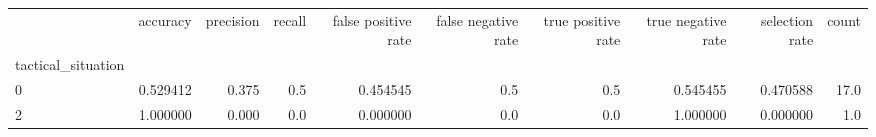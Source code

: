 \begin{tabular}{lrrrrrrrrr}
\toprule
{} &  accuracy &  precision &  recall &  false positive rate &  false negative rate &  true positive rate &  true negative rate &  selection rate &  count \\
tactical\_situation &           &            &         &                      &                      &                     &                     &                 &        \\
\midrule
0                  &  0.529412 &      0.375 &     0.5 &             0.454545 &                  0.5 &                 0.5 &            0.545455 &        0.470588 &   17.0 \\
2                  &  1.000000 &      0.000 &     0.0 &             0.000000 &                  0.0 &                 0.0 &            1.000000 &        0.000000 &    1.0 \\
\bottomrule
\end{tabular}
